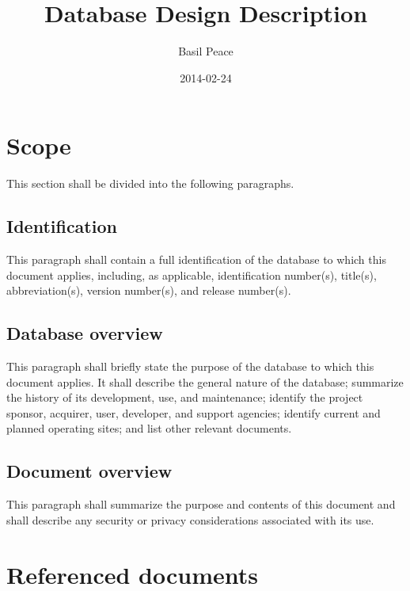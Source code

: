 \documentclass{fidata-report-template}
\begin{document}
\frontmatter

\title{Database Design Description}

\date{2014-02-24}

\author{Basil Peace}

\maketitle
\tableofcontents

\section{Scope}

This section shall be divided into the following paragraphs.

\subsection{Identification}

This paragraph shall contain a full identification of the database to
which this document applies, including, as applicable, identification
number(s), title(s), abbreviation(s), version number(s), and release
number(s).

\subsection{Database overview}

This paragraph shall briefly state the purpose of the database to which
this document applies. It shall describe the general nature of the
database; summarize the history of its development, use, and
maintenance; identify the project sponsor, acquirer, user, developer,
and support agencies; identify current and planned operating sites; and
list other relevant documents.

\subsection{Document overview}

This paragraph shall summarize the purpose and contents of this document
and shall describe any security or privacy considerations associated
with its use.

\section{Referenced documents}
\end{document}
